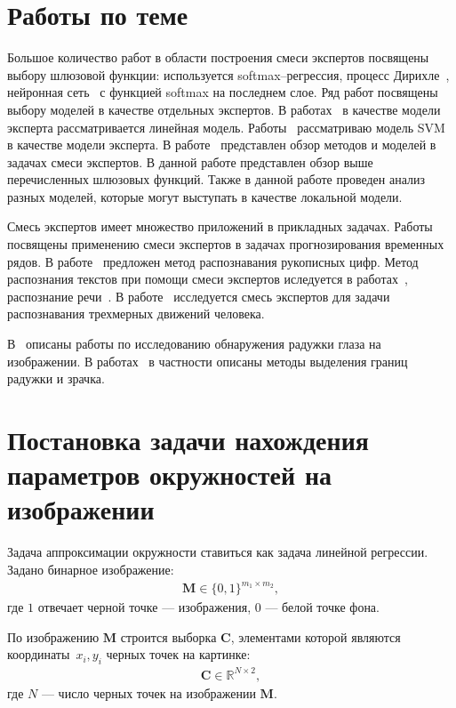 \documentclass[12pt, twoside]{article}
\numberwithin{equation}{section}
\begin{document}
\section{Работы по теме}
Большое количество работ в области построения смеси экспертов посвящены выбору шлюзовой функции: используется softmax--регрессия, процесс Дирихле~\cite{Edward2002}, нейронная сеть~\cite{Shazeer2017} с функцией softmax на последнем слое.
Ряд работ посвящены выбору моделей в качестве отдельных экспертов. В работах~\cite{Jordan1994, Jordan1991} в качестве модели эксперта рассматривается линейная модель. Работы~\cite{Lima2007, Cao2003} рассматриваю модель SVM в качестве модели эксперта.
В работе~\cite{Yuksel2012} представлен обзор методов и моделей в задачах смеси экспертов. В данной работе представлен обзор выше перечисленных шлюзовых функций. Также в данной работе проведен анализ разных моделей, которые могут выступать в качестве локальной модели.

Смесь экспертов имеет множество приложений в прикладных задачах. Работы~\cite{Yumlu2003, Cheung1995, Weigend2000} посвящены применению смеси экспертов в задачах прогнозирования временных рядов. 
В работе~\cite{Ebrahimpour2009} предложен метод распознавания рукописных цифр. 
Метод распознания текстов при помощи смеси экспертов иследуется в работах~\cite{Estabrooks2001}, распознание речи~\cite{Mossavat2010, Peng1996, Tuerk2001}. 
В работе~\cite{Sminchisescu2007} исследуется смесь экспертов для задачи распознавания трехмерных движений человека. 

В~\cite{Bowyer2010} описаны работы по исследованию обнаружения радужки глаза на изображении. В работах~\cite{Matveev2010, Matveev2014} в частности описаны методы выделения границ радужки и зрачка.

\section{Постановка задачи нахождения параметров окружностей на изображении}
Задача аппроксимации окружности ставиться как задача линейной регрессии.
Задано бинарное изображение:
\begin{equation}
\label{eq:st:cr:1}
\begin{aligned}
\textbf{M} \in \{0,1\}^{m_1 \times m_2},
\end{aligned}
\end{equation}
где $1$ отвечает черной точке --- изображения, $0$ --- белой точке фона.

По изображению $\textbf{M}$ строится выборка $\textbf{C}$, элементами которой являются координаты~$x_i, y_i$ черных точек на картинке:
\begin{equation}
\label{eq:st:cr:2}
\begin{aligned}
\textbf{C} \in  \mathbb{R}^{N \times 2},
\end{aligned}
\end{equation}
где $N$ --- число черных точек на изображении $\textbf{M}$.
\end{document}
